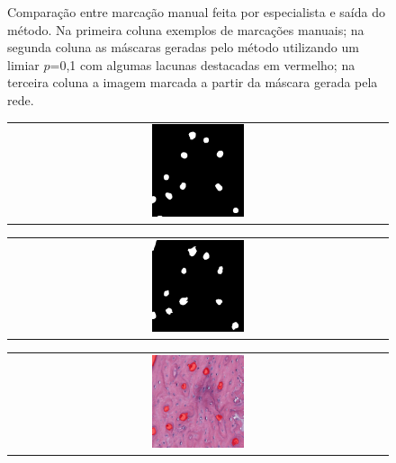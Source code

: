 \begin{figure}[h]
    \caption[Comparação entre marcação manual feita por especialista e saída do método.]{Comparação entre marcação manual feita por especialista e saída do método. Na primeira coluna exemplos de marcações manuais; na segunda coluna as máscaras geradas pelo método utilizando um limiar $p$=0,1 com algumas lacunas destacadas em vermelho; na terceira coluna a imagem marcada a partir da máscara gerada pela rede.}
    \label{fig:marcacoes-final-canal}
\end{figure}

\begin{figure}[h]
    \center
    \begin{tabular}{@{}c@{}}
        \includegraphics[width=0.25\textwidth]{figures/4_results/204_r3c2_mask_manual_10.png}
        \\[\abovecaptionskip]
    \end{tabular}
    \begin{tabular}{@{}c@{}}
        \includegraphics[width=0.25\textwidth]{figures/4_results/204_r3c2_mask_net_10.png}
        \\[\abovecaptionskip]
    \end{tabular}
    \begin{tabular}{@{}c@{}}
        \includegraphics[width=0.25\textwidth]{figures/4_results/204_r3c2_net_out_10.png}
        \\[\abovecaptionskip]
    \end{tabular}


\end{figure}

